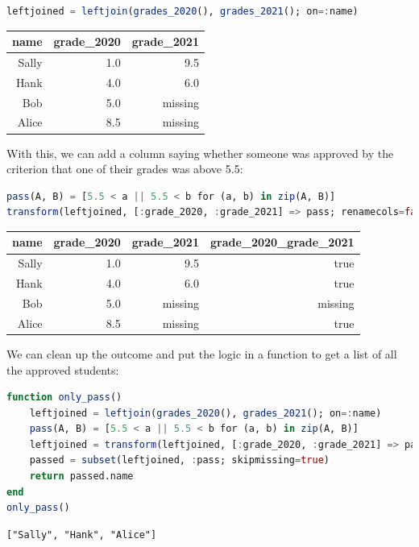 \documentclass[
  notoc %
]{tufte-book}
\begin{document}
\begin{lstlisting}[language=Julia]
leftjoined = leftjoin(grades_2020(), grades_2021(); on=:name)
\end{lstlisting}

\begin{longtable}[]{@{}rrr@{}}
\toprule
name & grade\_2020 & grade\_2021 \\
\midrule
\endhead
Sally & 1.0 & 9.5 \\
Hank & 4.0 & 6.0 \\
Bob & 5.0 & missing \\
Alice & 8.5 & missing \\
\bottomrule
\end{longtable}

With this, we can add a column saying whether someone was approved by
the criterion that one of their grades was above 5.5:

\begin{lstlisting}[language=Julia]
pass(A, B) = [5.5 < a || 5.5 < b for (a, b) in zip(A, B)]
transform(leftjoined, [:grade_2020, :grade_2021] => pass; renamecols=false)
\end{lstlisting}

\begin{longtable}[]{@{}rrrr@{}}
\toprule
name & grade\_2020 & grade\_2021 & grade\_2020\_grade\_2021 \\
\midrule
\endhead
Sally & 1.0 & 9.5 & true \\
Hank & 4.0 & 6.0 & true \\
Bob & 5.0 & missing & missing \\
Alice & 8.5 & missing & true \\
\bottomrule
\end{longtable}

We can clean up the outcome and put the logic in a function to get a
list of all the approved students:

\begin{lstlisting}[language=Julia]
function only_pass()
    leftjoined = leftjoin(grades_2020(), grades_2021(); on=:name)
    pass(A, B) = [5.5 < a || 5.5 < b for (a, b) in zip(A, B)]
    leftjoined = transform(leftjoined, [:grade_2020, :grade_2021] => pass => :pass)
    passed = subset(leftjoined, :pass; skipmissing=true)
    return passed.name
end
only_pass()
\end{lstlisting}

\begin{lstlisting}[language=Output]
["Sally", "Hank", "Alice"]
\end{lstlisting}
\end{document}
